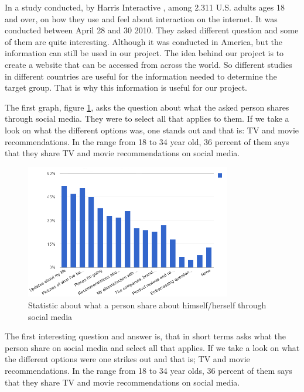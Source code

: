In a study conducted, by Harris Interactive \cite{Harris}, among 2.311 U.S. adults ages 18 and over, on how they use and feel about interaction on the internet. It was conducted between April 28 and 30 2010. They asked different question and some of them are quite interesting.
Although it was conducted in America, but the information can still be used in our project. The idea behind our project is to create a website that can be accessed from across the world. So different studies in different countries are useful for the information needed to determine the target group. That is why this information is useful for our project.

The first graph, figure \ref{Teori1}, asks the question about what the asked person shares through social media. They were to select all that applies to them. If we take a look on what the different options was, one stands out and that is: TV and movie recommendations. In the range from 18 to 34 year old, 36 percent of them says that they share TV and movie recommendations on social media.

\begin{figure}[H]
\centering
\includegraphics[width=0.8\textwidth]{Images/teori1.png}
\caption{Statistic about what a person share about himself/herself through social media}
\label{Teori1}
\end{figure}

The first interesting question and answer is, that in short terms asks what the person share on social media and select all that applies. If we take a look on what the different options were one strikes out and that is; TV and movie recommendations. In the range from 18 to 34 year olds, 36 percent of them says that they share TV and movie recommendations on social media.

